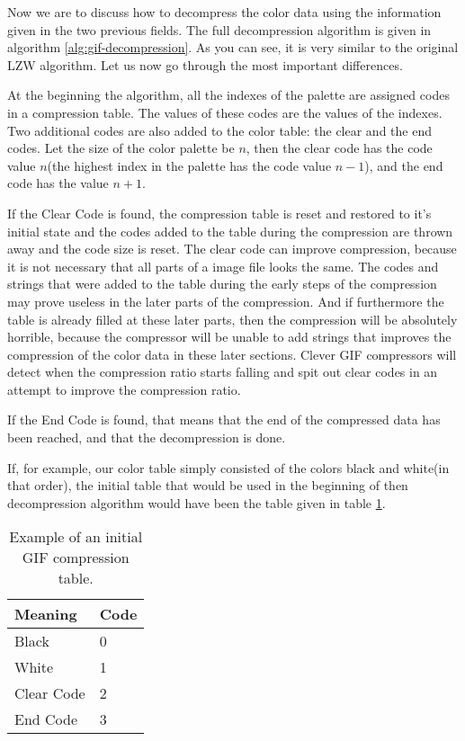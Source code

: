 Now we are to discuss how to decompress the color data using the
information given in the two previous fields. The full decompression
algorithm is given in algorithm \ref{alg:gif-decompression}. As you
can see, it is very similar to the original LZW algorithm. Let us
now go through the most important differences.

At the beginning the algorithm, all the indexes of the palette are
assigned codes in a compression table. The values of these codes are
the values of the indexes. Two additional codes are also added to the
color table: the clear and the end codes. Let the size of the color
palette be $n$, then the clear code has the code value $n$(the highest
index in the palette has the code value $n-1$), and the end code has
the value $n+1$.

If the Clear Code is found, the compression table is reset and
restored to it's initial state and the codes added to the table during
the compression are thrown away and the code size is reset. The clear
code can improve compression, because it is not necessary that all
parts of a image file looks the same. The codes and strings that were
added to the table during the early steps of the compression may prove
useless in the later parts of the compression. And if furthermore the
table is already filled at these later parts, then the compression
will be absolutely horrible, because the compressor will be unable to
add strings that improves the compression of the color data in these
later sections. Clever GIF compressors will detect when the
compression ratio starts falling and spit out clear codes in an
attempt to improve the compression ratio.

If the End Code is found, that means that the end of the compressed
data has been reached, and that the decompression is done.

If, for example, our color table simply consisted of the colors black
and white(in that order), the initial table that would be used in the
beginning of then decompression algorithm would have been the table
given in table \ref{tab:example-gif-color-table}.

\begin{table}
  \centering
  \begin{tabular}{ll}
    \toprule
    Meaning & Code \\
    \midrule
    Black & 0 \\
    White & 1 \\
    Clear Code & 2 \\
    End Code & 3 \\
    \bottomrule
  \end{tabular}
  \caption{Example of an initial GIF compression table.}
  \label{tab:example-gif-color-table}
\end{table}

